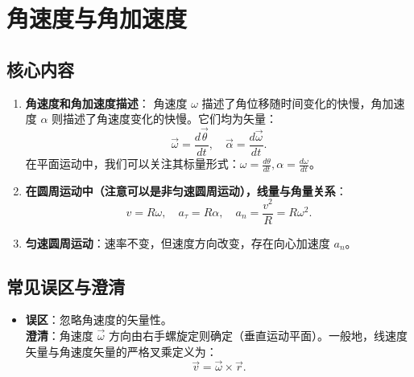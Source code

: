 \documentclass[UTF8]{ctexart}
\begin{document}
	\section{角速度与角加速度}
	\subsection*{核心内容}
	\begin{enumerate}
		\item \textbf{角速度和角加速度描述}：
		角速度 $\omega$ 描述了角位移随时间变化的快慢，角加速度 $\alpha$ 则描述了角速度变化的快慢。它们均为矢量：
		\[
		\vec{\omega} = \frac{d\vec{\theta}}{dt},\quad \vec{\alpha} = \frac{d\vec{\omega}}{dt}.
		\]
		在平面运动中，我们可以关注其标量形式：$\omega = \frac{d\theta}{dt}, \alpha = \frac{d\omega}{dt}$。
		\item \textbf{在圆周运动中（注意可以是非匀速圆周运动），线量与角量关系}：
		\[
		v = R\omega,\quad a_\tau = R\alpha,\quad a_n = \frac{v^2}{R} = R\omega^2.
		\]
		\item \textbf{匀速圆周运动}：速率不变，但速度方向改变，存在向心加速度 $a_n$。
	\end{enumerate}
	
	\subsection*{常见误区与澄清}
	\begin{itemize}
		\item \textbf{误区}：忽略角速度的矢量性。\\
		\textbf{澄清}：角速度 $\vec{\omega}$ 方向由右手螺旋定则确定（垂直运动平面）。一般地，线速度矢量与角速度矢量的严格叉乘定义为：
		\[
		\vec{v} = \vec{\omega} \times \vec{r}.
		\]
	\end{itemize}
	
\end{document}
